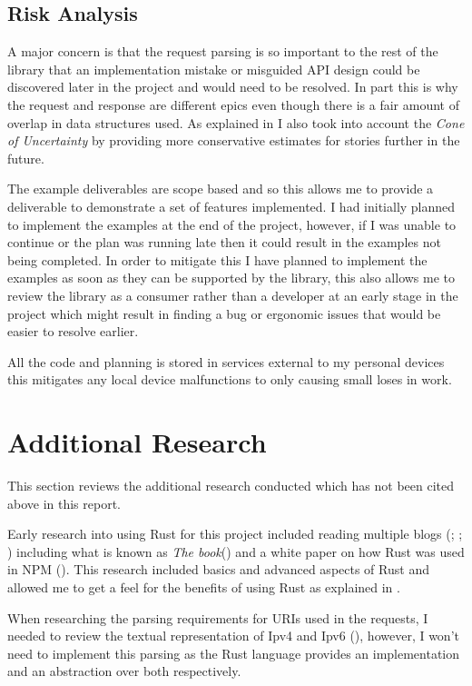 \documentclass[12pt, a4paper]{article}
\begin{document}
\subsection{Risk Analysis}

A major concern is that the request parsing is so important to the rest of the library that an implementation
mistake or misguided API design could be discovered later in the project and would need to be resolved.
In part this is why the request and response are different epics even though there is a fair amount 
of overlap in data structures used. As explained in \textbf{} I also
took into account the \emph{Cone of Uncertainty} by providing more conservative estimates for stories
further in the future.

The example deliverables are scope based and so this allows me to provide a deliverable to demonstrate
a set of features implemented. I had initially planned to implement the examples at the end of the
project, however, if I was unable to continue or the plan was running late then it could result in
the examples not being completed. In order to mitigate this I have planned to implement the examples
as soon as they can be supported by the library, this also allows me to review the library as a consumer
rather than a developer at an early stage in the project which might result in finding a bug or
ergonomic issues that would be easier to resolve earlier.

All the code and planning is stored in services external to my personal devices this mitigates any
local device malfunctions to only causing small loses in work.

\section{Additional Research}

This section reviews the additional research conducted which has not been cited above in this report.

Early research into using Rust for this project included reading multiple blogs
(\cite{knoldus-concurrency-in-rust}; \cite{ghostcell}; \cite{dblp-perfomance-vs-effort-rust-c}) including
what is known as \emph{The book}(\cite{rust-the-book}) and a white paper on how Rust was used in
NPM (\cite{rust-npm-paper}). This research included basics and advanced aspects of Rust and allowed
me to get a feel for the benefits of using Rust as explained in .

When researching the parsing requirements for URIs used in the requests, I needed to review the
textual representation of Ipv4 and Ipv6 (\cite{rfc5952}), however, I won't need to
implement this parsing as the Rust language provides an implementation and an abstraction over both
respectively.

\newpage
\printbibliography
\end{document}
